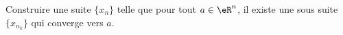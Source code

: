 
\begin{exercice}\label{exo0015}

Construire une suite $\{x_n\}$ telle que pour tout $a\in \eR^n$, il existe une sous suite $\{x_{n_k}\}$ qui converge vers $a$.

\end{exercice}
